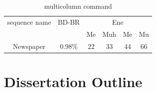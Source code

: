 \begin{table}
    \label{tab:tabular_example10}
    \centering
    \begin{tabular}{c c c c c c}
        \hline
        sequence name &
        BD-BR &
        \multicolumn{4}{c}{Ene} \\
        \cline{3-6}
        {} & {} & Me & Muh & Me & Mu\\
        \hline
        Newspaper & 0.98\% & 22 & 33 & 44 & 66\\
    \end{tabular}
    \caption{multicolumn command}
\end{table}





\section{Dissertation Outline}\label{sec:outline}





